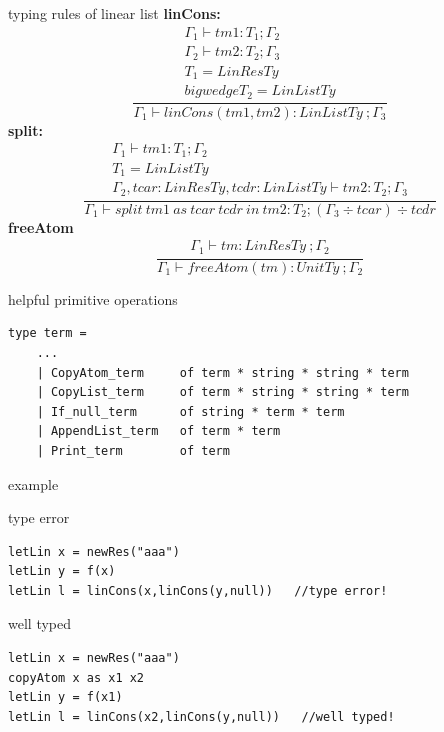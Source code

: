 \documentclass[10pt]{beamer}
\begin{document}
\begin{frame}[fragile]{typing rules of linear list}
\textbf{linCons:}
\[
	\frac{
		\begin{array}{c}
			 \Gamma_1 \vdash tm1 : T_1 ; \Gamma_2 \\
			 \Gamma_2 \vdash tm2 : T_2 ; \Gamma_3 \\
			 T_1 = LinResTy \\bigwedge T_2 = LinListTy			
		\end{array}
	}{
		\Gamma_1 \vdash linCons(tm1,tm2) : LinListTy\ ; \Gamma_3
	}
\]
\textbf{split:}
\[
	\frac{
		\begin{array}{c}
			\Gamma_1 \vdash tm1 : T_1 ; \Gamma_2 \\
			T_1 = LinListTy \\
			\Gamma_2, tcar : LinResTy, tcdr : LinListTy \vdash tm2 : T_2 ; \Gamma_3			
		\end{array}
	}{
		\Gamma_1 \vdash split\ tm1\ as\ tcar\ tcdr\ in\ tm2: T_2 ; (\Gamma_3 \div tcar) \div tcdr
	}
\]
\textbf{freeAtom}
\[
	\frac{
		\begin{array}{c}
			\Gamma_1 \vdash tm : LinResTy\ ; \Gamma_2
		\end{array}
	}{
		\Gamma_1 \vdash freeAtom(tm) : UnitTy\ ; \Gamma_2
	}
\]
\end{frame}

\begin{frame}[fragile]{helpful primitive operations}
\begin{verbatim}
type term = 
    ...
    | CopyAtom_term     of term * string * string * term
    | CopyList_term     of term * string * string * term
    | If_null_term      of string * term * term
    | AppendList_term   of term * term
    | Print_term        of term
\end{verbatim}

\end{frame}



\begin{frame}[fragile]{example}
\begin{alertblock}{type error}
\begin{verbatim}
letLin x = newRes("aaa")
letLin y = f(x)
letLin l = linCons(x,linCons(y,null))   //type error!
\end{verbatim}	
\end{alertblock}

\begin{exampleblock}{well typed}
\begin{verbatim}
letLin x = newRes("aaa")
copyAtom x as x1 x2
letLin y = f(x1)
letLin l = linCons(x2,linCons(y,null))   //well typed!
\end{verbatim}	
\end{exampleblock}
\end{frame}
\end{document}
